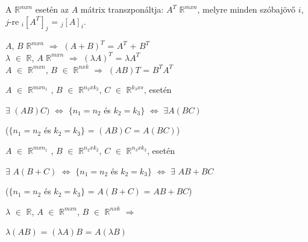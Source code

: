 	\begin{frame}
		\begin{tcolorbox}[title={Def.: Tranzponált}]
			A $\mathbb{R}^{m x n}$ esetén az $A$ mátrix transzponáltja: $A^T$ $\mathbb{R}^{m x n}$, melyre minden szóbajövő $i$, $j$-re $_{i} [A^T]_j$ = $_{j} [A]_i$.
		\end{tcolorbox}
		
		\begin{tcolorbox}[title={Tétel: Tranzponálás tulajdonságai}]
			$A$, $B$ $\mathbb{R}^{m x n}$ $\Rightarrow$ $(A + B)^T$ = $A^T$ + $B^T$\\
			${\lambda}$ $\in$ $\mathbb{R}$, $A$ $\mathbb{R}^{m x n}$ $\Rightarrow$ $({\lambda}A)^T$ = ${\lambda}A^T$\\
			$A$ $\in$ $\mathbb{R}^{m x n}$, $B$ $\in$ $\mathbb{R}^{n x k}$ $\Rightarrow$ $(AB)T$ = $B^TA^T$
		\end{tcolorbox}
		
		\begin{tcolorbox}[title={Tétel: Mátrixszorzás, és asszociativitás}]
			$A$ $\in$ $\mathbb{R}^{m x n_1}$ , $B$ $\in$ $\mathbb{R}^{n_2 x k_2}$, $C$ $\in$ $\mathbb{R}^{k_3 x s}$, esetén\\
			\mmedskip
			
			$\exists$ $(AB)C)$ $\iff$ $\{n_1 = n_2$ és $k_2 = k_3\}$ $\iff$ ${\exists}A(BC)$\\
			\mmedskip
			
			($\{n_1 = n_2$ és $k_2 = k_3\}$ = $(AB)C$ = $A(BC)$)
		\end{tcolorbox}
		
		\begin{tcolorbox}[title={Tétel: Mátrixszorzás és összeadás disztributivitása}]
			$A$ $\in$ $\mathbb{R}^{m x n_1}$ , $B$ $\in$ $\mathbb{R}^{n_2 x k_2}$, $C$ $\in$ $\mathbb{R}^{n_3 x k_3}$, esetén\\
			\mmedskip
			
			$\exists$ $A(B + C)$ $\iff$ $\{n_1 = n_2$ és $k_2 = k_3\}$ $\iff$ ${\exists}$ $AB + BC$\\
			\mmedskip
			
			($\{n_1 = n_2$ és $k_2 = k_3\}$ = $A(B + C)$ = $AB + BC$)
		\end{tcolorbox}
		
		\begin{tcolorbox}[title={Tétel: Számmal való szorzás és mátrixszorzás kapcsolata}]
			$\lambda$ $\in$ $\mathbb{R}$, $A$ $\in$ $\mathbb{R}^{m x n}$, $B$ $\in$ $\mathbb{R}^{n x k}$ $\Rightarrow$\\
			\mmedskip
			
			${\lambda}(AB)$ = $({\lambda}A)B$ = $A({\lambda}B)$\\
		\end{tcolorbox}
	\end{frame}
	
